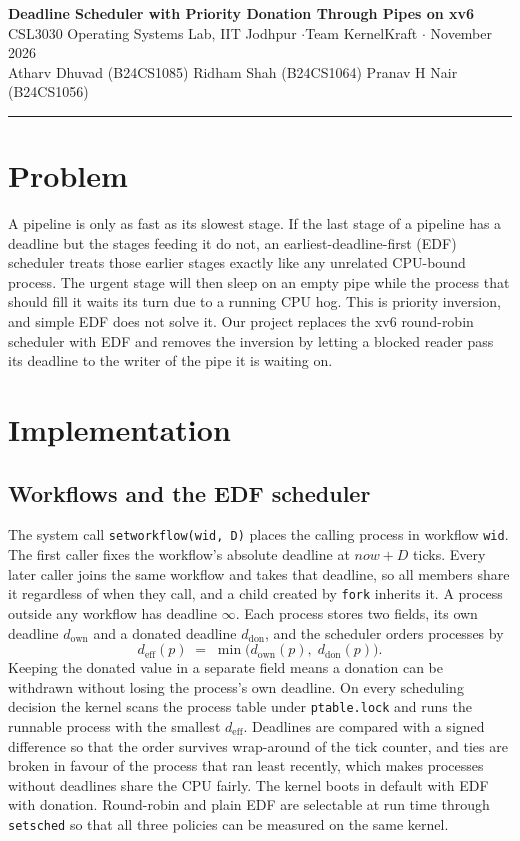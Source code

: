 \documentclass[10pt,a4paper]{article}
\newcommand{\code}[1]{\texttt{#1}}
\begin{document}
\begin{center}
{\Large\bfseries Deadline Scheduler with Priority Donation Through Pipes on xv6}\\[4pt]
{\normalsize CSL3030 Operating Systems Lab, IIT Jodhpur \quad$\cdot$\quad Team KernelKraft \quad$\cdot$ November 2026}\\[3pt]
{\normalsize Atharv Dhuvad (B24CS1085) \quad Ridham Shah (B24CS1064) \quad Pranav H Nair (B24CS1056)}
\end{center}
\vspace{-4pt}\hrule\vspace{4pt}

\section{Problem}

A pipeline is only as fast as its slowest stage. If the last stage of a pipeline has a deadline but the stages feeding it do not, an earliest-deadline-first (EDF) scheduler treats those earlier stages exactly like any unrelated CPU-bound process. The urgent stage will then sleep on an empty pipe while the process that should fill it waits its turn due to a running CPU hog. This is priority inversion, and simple EDF does not solve it. Our project replaces the xv6 round-robin scheduler with EDF and removes the inversion by letting a blocked reader pass its deadline to the writer of the pipe it is waiting on.

\section{Implementation}

\subsection{Workflows and the EDF scheduler}

The system call \code{setworkflow(wid, D)} places the calling process in workflow \code{wid}. The first caller fixes the workflow's absolute deadline at $\textit{now} + D$ ticks. Every later caller joins the same workflow and takes that deadline, so all members share it regardless of when they call, and a child created by \code{fork} inherits it. A process outside any workflow has deadline $\infty$. Each process stores two fields, its own deadline $d_{\text{own}}$ and a donated deadline $d_{\text{don}}$, and the scheduler orders processes by
\[
d_{\text{eff}}(p) \;=\; \min\bigl(d_{\text{own}}(p),\; d_{\text{don}}(p)\bigr).
\]
Keeping the donated value in a separate field means a donation can be withdrawn without losing the process's own deadline. On every scheduling decision the kernel scans the process table under \code{ptable.lock} and runs the runnable process with the smallest $d_{\text{eff}}$. Deadlines are compared with a signed difference so that the order survives wrap-around of the tick counter, and ties are broken in favour of the process that ran least recently, which makes processes without deadlines share the CPU fairly. The kernel boots in default with EDF with donation. Round-robin and plain EDF are selectable at run time through \code{setsched} so that all three policies can be measured on the same kernel.
\end{document}
